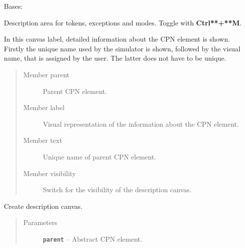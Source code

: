 \documentclass[a4paper,10pt,english]{sphinxmanual}
\begin{document}

\begin{fulllineitems}
\label{model_link:model.AbstractItem.DescriptionCanvas}
Bases: 

Description area for tokens, exceptions and modes. Toggle with \textbf{Ctrl**+**M}.

In this canvas label, detailed information about the CPN element is shown.
Firstly the unique name used by the simulator is shown, followed by the visual name, 
that is assigned by the user. The latter does not have to be unique.
\begin{quote}\begin{description}
\item[{Member parent}] \leavevmode
Parent CPN element.

\item[{Member label}] \leavevmode
Visual representation of the information about the CPN element.

\item[{Member text}] \leavevmode
Unique name of parent CPN element.

\item[{Member visibility}] \leavevmode
Switch for the visibility of the description canvas.

\end{description}\end{quote}

\begin{fulllineitems}
\label{model_link:model.AbstractItem.DescriptionCanvas.__init__}
Create description canvas.
\begin{quote}\begin{description}
\item[{Parameters}] \leavevmode
\textbf{\texttt{parent}} -- Abstract CPN element.

\end{description}\end{quote}

\end{fulllineitems}



\end{fulllineitems}
\end{document}

